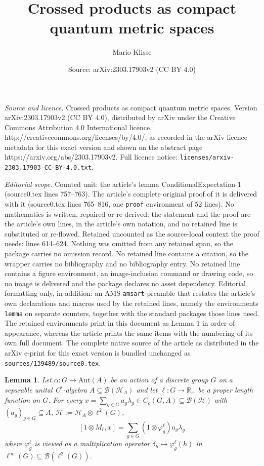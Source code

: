 \documentclass[10pt,a4paper]{amsart}
\title{Crossed products as compact quantum metric spaces}
\author{Mario Klisse}
\date{Source: arXiv:2303.17903v2 (CC BY 4.0)}
\newtheorem{lemma}{Lemma}
\begin{document}
\maketitle

\noindent\emph{Source and licence.} Crossed products as compact quantum metric spaces. Version arXiv:2303.17903v2 (CC BY 4.0), distributed by arXiv under the Creative Commons Attribution 4.0 International licence, http://creativecommons.org/licenses/by/4.0/, as recorded in the arXiv licence metadata for this exact version and shown on the abstract page https://arxiv.org/abs/2303.17903v2. Full licence notice: \texttt{licenses/arxiv-2303.17903-CC-BY-4.0.txt}.\par\smallskip

\noindent\textit{Editorial scope.} Counted unit: the article's lemma ConditionalExpectation-1 (source0.tex lines 757--763). The article's complete original proof of it is delivered with it (source0.tex lines 765--816, one \texttt{proof} environment of 52 lines). No mathematics is written, repaired or re-derived: the statement and the proof are the article's own lines, in the article's own notation, and no retained line is substituted or re-flowed.  Retained uncounted as the source-local context the proof needs: lines 614--624.  Nothing was omitted from any retained span, so the package carries no omission record.  No retained line contains a citation, so the wrapper carries no bibliography and no bibliography entry.  No retained line contains a figure environment, an image-inclusion command or drawing code, so no image is delivered and the package declares no asset dependency.  Editorial formatting only, in addition: an AMS \texttt{amsart} preamble that restates the article's own declarations and macros used by the retained lines, namely the environments \texttt{lemma} on separate counters, together with the standard packages those lines need.  The retained environments print in this document as Lemma 1 in order of appearance, whereas the article prints the same items with the numbering of its own full document.  The complete native source of the article as distributed in the arXiv e-print for this exact version is bundled unchanged as \texttt{sources/139489/source0.tex}.
\begin{lemma} \label{Commutator identity} Let $\alpha:G\rightarrow\text{Aut}(A)$
be an action of a discrete group $G$ on a separable unital C$^{\ast}$-algebra
$A\subseteq\mathcal{B}(\mathcal{H}_{A})$ and let $\ell:G\rightarrow\mathbb{R}_{+}$
be a proper length function on $G$. For every $x=\sum_{g\in G}a_{g}\lambda_{g}\in C_{c}(G,A)\subseteq\mathcal{B}(\mathcal{H})$
with $(a_{g})_{g\in G}\subseteq A$, $\mathcal{H}:=\mathcal{H}_{A}\otimes\ell^{2}(G)$,
\[
[1\otimes M_{\ell},x]=\sum_{g\in G}(1\otimes\varphi_{g}^{\ell})a_{g}\lambda_{g}
\]
where $\varphi_{g}^{\ell}$ is viewed as a multiplication operator
$\delta_{h}\mapsto\varphi_{g}^{\ell}(h)$ in $\ell^{\infty}(G)\subseteq\mathcal{B}(\ell^{2}(G))$.
\end{lemma}
\end{document}
